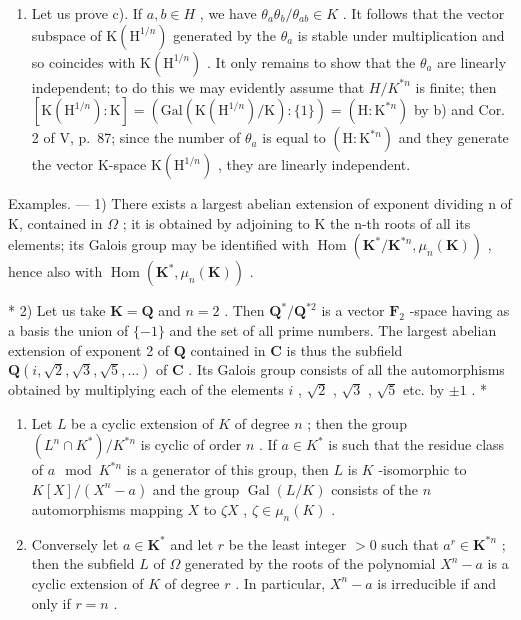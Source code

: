 \begin{enumerate}
\def\labelenumi{\Alph{enumi})}
\setcounter{enumi}{3}
\tightlist
\item
  Let us prove c). If \(a, b \in H\) , we have \(\theta_{a}\theta_{b}/\theta_{ab} \in K\) . It follows that the vector subspace of \(\mathrm{K}(\mathrm{H}^{1/n})\) generated by the \(\theta_{a}\) is stable under multiplication and so coincides with \(\mathrm{K}(\mathrm{H}^{1/n})\) . It only remains to show that the \(\theta_{a}\) are linearly independent; to do this we may evidently assume that \(H/K^{*n}\) is finite; then \([\mathrm{K}(\mathrm{H}^{1/n}): \mathrm{K}] = (\mathrm{Gal}(\mathrm{K}(\mathrm{H}^{1/n})/\mathrm{K}) : \{1\}) = (\mathrm{H}: \mathrm{K}^{*n})\) by b) and Cor. 2 of V, p.~87; since the number of \(\theta_{a}\) is equal to \((\mathrm{H}: \mathrm{K}^{*n})\) and they generate the vector K-space \(\mathrm{K}(\mathrm{H}^{1/n})\) , they are linearly independent.
\end{enumerate}

Examples. --- 1) There exists a largest abelian extension of exponent dividing n of K, contained in \(\Omega\) ; it is obtained by adjoining to K the n-th roots of all its elements; its Galois group may be identified with \(\operatorname{Hom}(\mathbf{K}^{*}/\mathbf{K}^{*n}, \mu_{n}(\mathbf{K}))\) , hence also with \(\operatorname{Hom}(\mathbf{K}^{*}, \mu_{n}(\mathbf{K}))\) .

* 2) Let us take \(\mathbf{K} = \mathbf{Q}\) and \(n = 2\) . Then \(\mathbf{Q}^{*}/\mathbf{Q}^{*2}\) is a vector \(\mathbf{F}_{2}\) -space having as a basis the union of \(\{-1\}\) and the set of all prime numbers. The largest abelian extension of exponent 2 of \(\mathbf{Q}\) contained in \(\mathbf{C}\) is thus the subfield \(\mathbf{Q}(i, \sqrt{2}, \sqrt{3}, \sqrt{5}, \ldots)\) of \(\mathbf{C}\) . Its Galois group consists of all the automorphisms obtained by multiplying each of the elements \(i\) , \(\sqrt{2}\) , \(\sqrt{3}\) , \(\sqrt{5}\) etc. by \(\pm 1\) . *

\begin{enumerate}
\def\labelenumi{\arabic{enumi})}
\setcounter{enumi}{2}
\item
  Let \(L\) be a cyclic extension of \(K\) of degree \(n\) ; then the group \((L^n \cap K^*) / K^{*n}\) is cyclic of order \(n\) . If \(a \in K^*\) is such that the residue class of \(a \mod K^{*n}\) is a generator of this group, then \(L\) is \(K\) -isomorphic to \(K[X] / (X^n - a)\) and the group \(\operatorname{Gal}(L / K)\) consists of the \(n\) automorphisms mapping \(X\) to \(\zeta X\) , \(\zeta \in \mu_n(K)\) .
\item
  Conversely let \(a \in \mathbf{K}^*\) and let \(r\) be the least integer \(> 0\) such that \(a^r \in \mathbf{K}^{*n}\) ; then the subfield \(L\) of \(\Omega\) generated by the roots of the polynomial \(X^n - a\) is a cyclic extension of \(K\) of degree \(r\) . In particular, \(X^n - a\) is irreducible if and only if \(r = n\) .
\end{enumerate}

